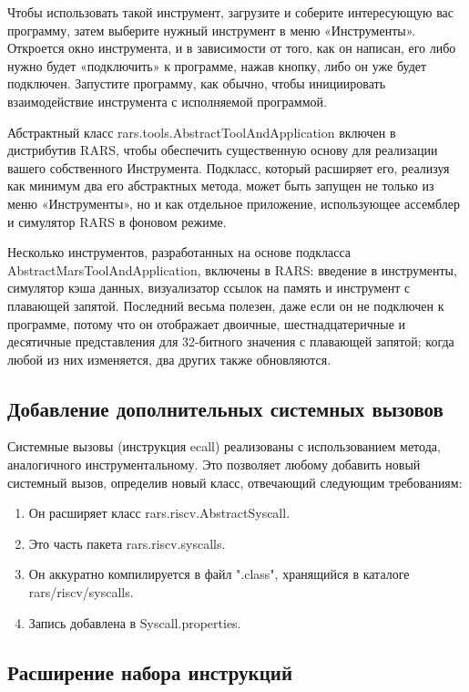Чтобы использовать такой инструмент, загрузите и соберите интересующую вас программу, затем выберите нужный инструмент в меню «Инструменты». Откроется окно инструмента, и в зависимости от того, как он написан, его либо нужно будет «подключить» к программе, нажав кнопку, либо он уже будет подключен. Запустите программу, как обычно, чтобы инициировать взаимодействие инструмента с исполняемой программой.

Абстрактный класс rars.tools.AbstractToolAndApplication включен в дистрибутив RARS, чтобы обеспечить существенную основу для реализации вашего собственного Инструмента. Подкласс, который расширяет его, реализуя как минимум два его абстрактных метода, может быть запущен не только из меню «Инструменты», но и как отдельное приложение, использующее ассемблер и симулятор RARS в фоновом режиме.

Несколько инструментов, разработанных на основе подкласса AbstractMarsToolAndApplication, включены в RARS: введение в инструменты, симулятор кэша данных, визуализатор ссылок на память и инструмент с плавающей запятой. Последний весьма полезен, даже если он не подключен к программе, потому что он отображает двоичные, шестнадцатеричные и десятичные представления для 32-битного значения с плавающей запятой; когда любой из них изменяется, два других также обновляются.

\subsection{Добавление дополнительных системных вызовов}

Системные вызовы (инструкция ecall) реализованы с использованием метода, аналогичного инструментальному. Это позволяет любому добавить новый системный вызов, определив новый класс, отвечающий следующим требованиям:
\begin{enumerate}
    \item Он расширяет класс rars.riscv.AbstractSyscall.
    \item Это часть пакета rars.riscv.syscalls.
    \item Он аккуратно компилируется в файл ".class", хранящийся в каталоге rars/riscv/syscalls.
    \item Запись добавлена в Syscall.properties.
\end{enumerate}

\subsection{Расширение набора инструкций}

